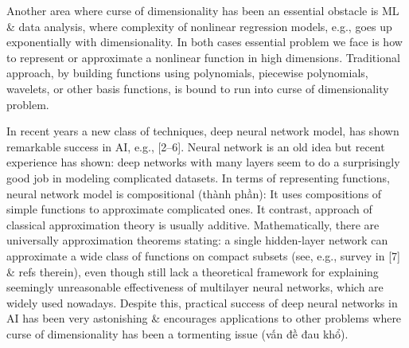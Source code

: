 \documentclass{article}
\begin{document}
\begin{itemize}
	Another area where curse of dimensionality has been an essential obstacle is ML \& data analysis, where complexity of nonlinear regression models, e.g., goes up exponentially with dimensionality. In both cases essential problem we face is how to represent or approximate a nonlinear function in high dimensions. Traditional approach, by building functions using polynomials, piecewise polynomials, wavelets, or other basis functions, is bound to run into curse of dimensionality problem.

	In recent years a new class of techniques, deep neural network model, has shown remarkable success in AI, e.g., [2--6]. Neural network is an old idea but recent experience has shown: deep networks with many layers seem to do a surprisingly good job in modeling complicated datasets. In terms of representing functions, neural network model is compositional (thành phần): It uses compositions of simple functions to approximate complicated ones. It contrast, approach of classical approximation theory is usually additive. Mathematically, there are universally approximation theorems stating: a single hidden-layer network can approximate a wide class of functions on compact subsets (see, e.g., survey in [7] \& refs therein), even though still lack a theoretical framework for explaining seemingly unreasonable effectiveness of multilayer neural networks, which are widely used nowadays. Despite this, practical success of deep neural networks in AI has been very astonishing \& encourages applications to other problems where curse of dimensionality has been a tormenting issue (vấn đề đau khổ).


\end{itemize}
\end{document}
